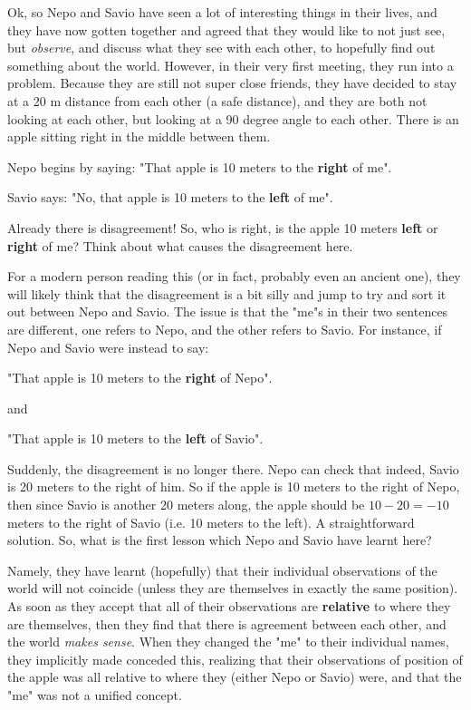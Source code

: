 \documentclass{article}
\begin{document}
Ok, so Nepo and Savio have seen a lot of interesting things in their lives, and they have now gotten together and agreed that they would like to not just see, but \textit{observe}, and discuss what they see with each other, to hopefully find out something about the world. However, in their very first meeting, they run into a problem. Because they are still not super close friends, they have decided to stay at a 20 m distance from each other (a safe distance), and they are both not looking at each other, but looking at a 90 degree angle to each other. There is an apple sitting right in the middle between them. 

Nepo begins by saying: "That apple is 10 meters to the \textbf{right} of me". 

Savio says: "No, that apple is 10 meters to the \textbf{left} of me". 

Already there is disagreement! So, who is right, is the apple 10 meters \textbf{left} or \textbf{right} of me? Think about what causes the disagreement here.

For a modern person reading this (or in fact, probably even an ancient one), they will likely think that the disagreement is a bit silly and jump to try and sort it out between Nepo and Savio. The issue is that the "me"s in their two sentences are different, one refers to Nepo, and the other refers to Savio. For instance, if Nepo and Savio were instead to say:

"That apple is 10 meters to the \textbf{right} of Nepo".

and 

"That apple is 10 meters to the \textbf{left} of Savio". 

Suddenly, the disagreement is no longer there. Nepo can check that indeed, Savio is 20 meters to the right of him. So if the apple is 10 meters to the right of Nepo, then since Savio is another 20 meters along, the apple should be $10 - 20 = -10$ meters to the right of Savio (i.e. 10 meters to the left). A straightforward solution. So, what is the first lesson which Nepo and Savio have learnt here?

Namely, they have learnt (hopefully) that their individual observations of the world will not coincide (unless they are themselves in exactly the same position). As soon as they accept that all of their observations are \textbf{relative} to where they are themselves, then they find that there is agreement between each other, and the world \textit{makes sense}. When they changed the "me" to their individual names, they implicitly made conceded this, realizing that their observations of position of the apple was all relative to where they (either Nepo or Savio) were, and that the "me" was not a unified concept.
\end{document}
